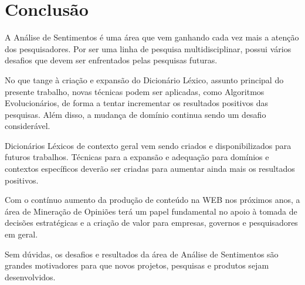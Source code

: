 \documentclass[12pt]{article}
\begin{document}
\section{Conclusão}\label{conclusion}

A Análise de Sentimentos é uma área que vem ganhando cada vez mais a atenção dos pesquisadores. Por ser uma linha de pesquisa multidisciplinar, possui vários desafios que devem ser enfrentados pelas pesquisas futuras.

No que tange à criação e expansão do Dicionário Léxico, assunto principal do presente trabalho, novas técnicas podem ser aplicadas, como Algoritmos Evolucionários, de forma a tentar incrementar os resultados positivos das pesquisas. Além disso, a mudança de domínio continua sendo um desafio considerável.

Dicionários Léxicos de contexto geral vem sendo criados e disponibilizados para futuros trabalhos. Técnicas para a expansão e adequação para domínios e contextos específicos deverão ser criadas para aumentar ainda mais os resultados positivos.

Com o contínuo aumento da produção de conteúdo na WEB nos próximos anos, a área de Mineração de Opiniões terá um papel fundamental no apoio à tomada de decisões estratégicas e a criação de valor para empresas, governos e pesquisadores em geral. 

Sem dúvidas, os desafios e resultados da área de Análise de Sentimentos são grandes motivadores para que novos projetos, pesquisas e produtos sejam desenvolvidos.



\end{document}
